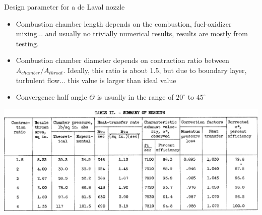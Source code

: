 \documentclass{beamer}
\begin{document}
\begin{frame}[t]{Design parameter for a de Laval nozzle}
    \begin{itemize}
        \item Combustion chamber length depends on the combustion, fuel-oxidizer mixing... and usually no trivially numerical results, results are mostly from testing.
        \item Combustion chamber diameter depends on contraction ratio between $A_{chamber} / A_{throat}$. Ideally, this ratio is about 1.5, but due to boundary layer, turbulent flow... this value is larger than ideal value
        \item Convergence half angle $\Theta$ is usually in the range of $20^{\circ}$ to $45^{\circ}$
    \end{itemize}
    \centering \includegraphics[height = 0.5\textheight]{images/combustion_contraction_ratio.png}
\end{frame}

\end{document}
